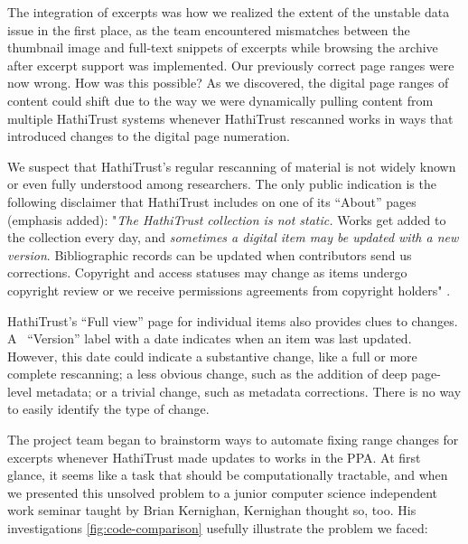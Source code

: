 \documentclass{anthology-ch}         %
\begin{document}
The integration of excerpts was how we realized the extent of the unstable data issue in the first place, as the team encountered mismatches between the thumbnail image and full-text snippets of excerpts while browsing the archive after excerpt support was implemented. Our previously correct page ranges were now wrong. How was this possible? As we discovered, the digital page ranges of content could shift due to the way we were dynamically pulling content from multiple HathiTrust systems whenever HathiTrust rescanned works in ways that introduced changes to the digital page numeration.

We suspect that HathiTrust’s regular rescanning of material is not widely known or even fully understood among researchers. The only public indication is the following disclaimer that HathiTrust includes on one of its “About” pages (emphasis added): "\textit{The HathiTrust collection is not static.} Works get added to the collection every day, and \textit{sometimes a digital item may be updated with a new version}. Bibliographic records can be updated when contributors send us corrections. Copyright and access statuses may change as items undergo copyright review or we receive permissions agreements from copyright holders" \cite{noauthor_how_nodate}.

HathiTrust’s “Full view” page for individual items also provides clues to changes. A  “Version” label with a date indicates when an item was last updated. However, this date could indicate a substantive change, like a full or more complete rescanning; a less obvious change, such as the addition of deep page-level metadata; or a trivial change, such as metadata corrections. There is no way to easily identify the type of change.

The project team began to brainstorm ways to automate fixing range changes for excerpts whenever HathiTrust made updates to works in the PPA. At first glance, it seems like a task that should be computationally tractable, and when we presented this unsolved problem to a junior computer science independent work seminar taught by Brian Kernighan, Kernighan thought so, too. His investigations \ref{fig:code-comparison} usefully illustrate the problem we faced: 
\end{document}
